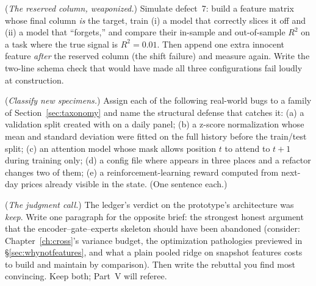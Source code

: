 \begin{exercise}\label{ex:3-reserved}
(\emph{The reserved column, weaponized.}) Simulate defect~7: build a
feature matrix whose final column \emph{is} the target, train (i) a model
that correctly slices it off and (ii) a model that ``forgets,'' and compare
their in-sample and out-of-sample $R^2$ on a task where the true signal is
$R^2 = 0.01$. Then append one extra innocent feature \emph{after} the
reserved column (the shift failure) and measure again. Write the two-line
schema check that would have made all three configurations fail loudly at
construction.
\end{exercise}

\begin{exercise}\label{ex:3-taxonomy}
(\emph{Classify new specimens.}) Assign each of the following real-world
bugs to a family of Section~\ref{sec:taxonomy} and name the structural
defense that catches it: (a) a validation split created with
 on a daily panel; (b) a
z-score normalization whose mean and standard deviation were fitted on the
full history before the train/test split; (c) an attention model whose
mask allows position $t$ to attend to $t{+}1$ during training only; (d) a
config file where  appears in three places and a refactor
changes two of them; (e) a reinforcement-learning reward computed from
next-day prices already visible in the state. (One sentence each.)
\end{exercise}

\begin{exercise}\label{ex:3-keep}
(\emph{The judgment call.}) The ledger's verdict on the prototype's
architecture was \emph{keep}. Write one paragraph for the opposite brief:
the strongest honest argument that the encoder--gate--experts skeleton
should have been abandoned (consider: Chapter~\ref{ch:cross}'s variance
budget, the optimization pathologies previewed in
\S\ref{sec:whynotfeatures}, and what a plain pooled ridge on snapshot
features costs to build and maintain by comparison). Then write the
rebuttal you find most convincing. Keep both; Part~V will referee.
\end{exercise}
